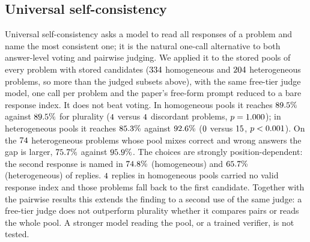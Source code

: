 \documentclass[preprint,11pt,number,sort&compress]{elsarticle}
\begin{document}
\begin{table}[htbp]
\centering
\caption{Accuracy (\%) on graded problems, by track and selector. `--': no
Kemeny--Young comparator (GSM8K). Bold: best of the three practical
selectors when they differ. Primed rows: heterogeneous generation.}
\label{tab:tracks}
\small\setlength{\tabcolsep}{4pt}
\end{table}

\begin{table}[htbp]
\centering
\caption{Paired comparison of OR-Select with each reference selector. Cells
give (problems where OR-Select is right and the reference wrong)/(the
reverse) and the exact two-sided McNemar $p$-value.}
\label{tab:paired}
\small\setlength{\tabcolsep}{3pt}
\end{table}

\subsection{Universal self-consistency}
\label{sec:usc}

Universal self-consistency \citep{chen2023usc} asks a model to read all responses of a problem and name the
most consistent one; it is the natural one-call alternative to both answer-level voting and pairwise
judging. We applied it to the stored pools of every problem with stored candidates ($334$
homogeneous and $204$ heterogeneous problems, so more than the judged subsets above), with the same free-tier judge model, one call per problem and
the paper's free-form prompt reduced to a bare response index. It does not beat voting. In homogeneous
pools it reaches $89.5\%$ against $89.5\%$ for plurality ($4$ versus $4$ discordant
problems, $p=1.000$); in heterogeneous pools it reaches $85.3\%$ against $92.6\%$
($0$ versus $15$, $p<0.001$). On the $74$ heterogeneous problems whose pool
mixes correct and wrong answers the gap is larger, $75.7\%$ against $95.9\%$.
The choices are strongly position-dependent: the second response is named in $74.8\%$
(homogeneous) and $65.7\%$ (heterogeneous) of replies. $4$ replies in homogeneous
pools carried no valid response index and those problems fall back to the first candidate. Together with
the pairwise results this extends the finding to a second use of the same judge: a free-tier judge
does not outperform plurality whether it compares pairs or reads the whole pool. A stronger model
reading the pool, or a trained verifier, is not tested.
\end{document}
